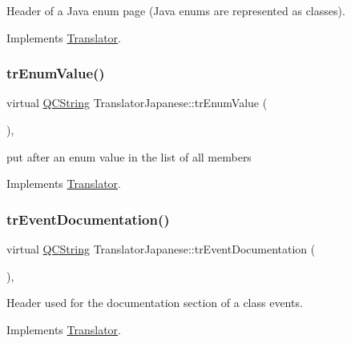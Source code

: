 Header of a Java enum page (Java enums are represented as classes). 

Implements \mbox{\hyperlink{class_translator}{Translator}}.

\mbox{\label{class_translator_japanese_a22c91fb4d65a211817217acc600afbd5}} 
\subsubsection{\texorpdfstring{trEnumValue()}{trEnumValue()}}
{\footnotesize\ttfamily virtual \mbox{\hyperlink{class_q_c_string}{Q\+C\+String}} Translator\+Japanese\+::tr\+Enum\+Value (\begin{DoxyParamCaption}{ }\end{DoxyParamCaption})\hspace{0.3cm}{\ttfamily [inline]}, {\ttfamily [virtual]}}

put after an enum value in the list of all members 

Implements \mbox{\hyperlink{class_translator}{Translator}}.

\mbox{\label{class_translator_japanese_a5c0b0cd38680a740837e989505918799}} 
\subsubsection{\texorpdfstring{trEventDocumentation()}{trEventDocumentation()}}
{\footnotesize\ttfamily virtual \mbox{\hyperlink{class_q_c_string}{Q\+C\+String}} Translator\+Japanese\+::tr\+Event\+Documentation (\begin{DoxyParamCaption}{ }\end{DoxyParamCaption})\hspace{0.3cm}{\ttfamily [inline]}, {\ttfamily [virtual]}}

Header used for the documentation section of a class\textquotesingle{} events. 

Implements \mbox{\hyperlink{class_translator}{Translator}}.

\mbox{\label{class_translator_japanese_aa76891354ed3cd9b0ccdd0aab601b022}} 
